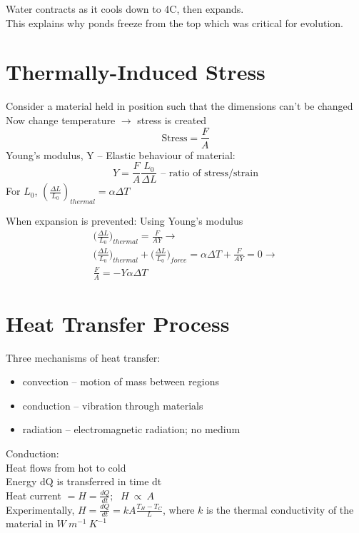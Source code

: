 \documentclass[a4paper, 11pt, fleqn, normalem]{report}
\begin{document}
Water contracts as it cools down to 4{\textdegree}C, then expands. \\
This explains why ponds freeze from the top which was critical for evolution.

\section*{Thermally-Induced Stress}
Consider a material held in position such that the dimensions can't be changed\\
Now change temperature $\rightarrow$ stress is created
\begin{equation*}
	\text{Stress} = \frac{F}{A}
\end{equation*}
Young's modulus, Y -- Elastic behaviour of material:
\begin{equation*}
	Y = \frac{F}{A}\frac{L_{0}}{{\Delta}L} \text{ -- ratio of stress/strain}
\end{equation*}
For $L_{0}$, $(\frac{{\Delta}L}{L_{0}})_{thermal} = \alpha{\Delta}T$

When expansion is prevented: Using Young's modulus
\begin{gather*}
	\bigg(\frac{{\Delta}L}{L_{0}}\bigg)_{thermal} = \frac{F}{AY} \rightarrow \\
	\bigg(\frac{{\Delta}L}{L_{0}}\bigg)_{thermal} + \bigg(\frac{{\Delta}L}{L_{0}}\bigg)_{force} = \alpha{\Delta}T + \frac{F}{AY} = 0 \rightarrow \\
	\frac{F}{A} = -Y\alpha{\Delta}T
\end{gather*}

\section*{Heat Transfer Process}
Three mechanisms of heat transfer:
\vspace{-12pt}
\begin{itemize}
	\item convection -- motion of mass between regions
	\item conduction -- vibration through materials
	\item radiation -- electromagnetic radiation; no medium
\end{itemize}
\vspace{-8pt}
Conduction: \\
Heat flows from hot to cold \\
Energy dQ is transferred in time dt \\
Heat current $= H = \frac{dQ}{dt} \text{; }~~ H~\propto~A$ \\
Experimentally, $H = \frac{dQ}{dt} = kA\frac{T_{H}-T_{C}}{L}$, where $k$ is the thermal conductivity of the material in $W~m^{-1}~K^{-1}$
\end{document}
